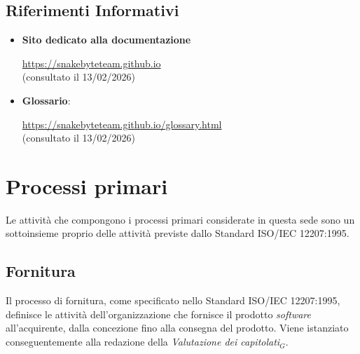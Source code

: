 \documentclass[10pt, letterpaper]{article}
\begin{document}
\subsection{Riferimenti Informativi}
\begin{itemize}
    \item \textbf{Sito dedicato alla documentazione}

        \url{https://snakebyteteam.github.io}
        \\ (consultato il 13/02/2026)

    \item \textbf{Glossario}:

        \url{https://snakebyteteam.github.io/glossary.html}
        \\(consultato il 13/02/2026)

\end{itemize}

\section{Processi primari}
Le attività  che compongono i processi primari considerate in questa sede sono un sottoinsieme proprio delle attività previste dallo Standard ISO/IEC 12207:1995.
\subsection{Fornitura}
Il processo di fornitura, come specificato nello Standard ISO/IEC 12207:1995, definisce le attività dell'organizzazione che fornisce il prodotto \textit{software} all'acquirente, dalla concezione fino alla consegna del prodotto. Viene istanziato conseguentemente alla redazione della \textit{Valutazione dei \textit{capitolati$_{G}$}}.
\end{document}
